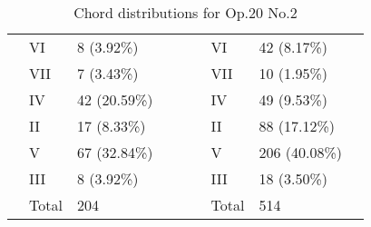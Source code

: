 \begin{table}[]
{\begin{tabular}{|l|l|l|l|l|l|l|l|l|}
 & VI & 8 (3.92\%) &  &  &  & VI & 42 (8.17\%) &  \\ \cline{2-3} \cline{7-8}
 & VII & 7 (3.43\%) &  &  &  & VII & 10 (1.95\%) &  \\ \cline{2-3} \cline{7-8}
 & IV & 42 (20.59\%) &  &  &  & IV & 49 (9.53\%) &  \\ \cline{2-3} \cline{7-8}
 & II & 17 (8.33\%) &  &  &  & II & 88 (17.12\%) &  \\ \cline{2-3} \cline{7-8}
 & V & 67 (32.84\%) &  &  &  & V & 206 (40.08\%) &  \\ \cline{2-3} \cline{7-8}
 & III & 8 (3.92\%) &  &  &  & III & 18 (3.50\%) &  \\ \cline{2-3} \cline{7-8}
 & Total & 204 &  &  &  & Total & 514 &  \\ \cline{1-4} \cline{6-9}
\end{tabular}
}
\caption{Chord distributions for Op.20 No.2}
\label{table:chords_op20n2}
\end{table}


\newpage
